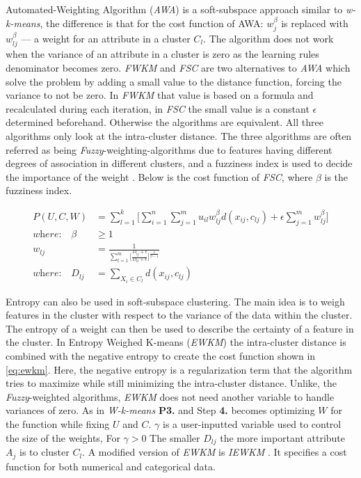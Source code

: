 \documentclass[../report.tex]{subfiles}
\begin{document}
Automated-Weighting Algorithm (\textit{AWA}) \cite{Chan2004} is a soft-subspace approach similar to \textit{w-k-means}, the difference is that for the cost function of AWA: $w_j^\beta$ is replaced with $w_{ lj }^\beta$ --- a weight for an attribute in a cluster $C_l$. The algorithm does not work when the variance of an attribute in a cluster is zero as the learning rules denominator becomes zero\cite{Jing2005}. \textit{ FWKM } \cite{Jing2005} and \textit{FSC} are two alternatives to \textit{AWA} which solve the problem by adding a small value to the distance function, forcing the variance to not be zero. In \textit{FWKM} that value is based on a formula and recalculated during each iteration, in \textit{FSC} the small value is a constant $\epsilon$ determined beforehand. Otherwise the algorithms are equivalent. All three algorithms only look at the intra-cluster distance. The three algorithms are often referred as being \textit{Fuzzy}-weighting-algorithms due to features having different degrees of association in different clusters, and a fuzziness index is used to decide the importance of the weight \cite{Gan2006}. Below is the cost function of \textit{FSC}, where $\beta$ is the fuzziness index.

\begin{align}
\label{eq:cost-fsc}
  P(U,C,W) &= \sum^k_{l=1} \Bigg[ \sum^n_{i=1} \sum^m_{j=1} u_{il} w_{ lj }^{\beta} d(x_{ij},c_{lj}) + \epsilon \sum_{j=1}^{m}{ w_{lj}^{\beta} } \Bigg] \\
\textit{where:}\quad\beta&\geq 1 \\
\label{eq:fsc}
w_{lj} &= \frac{1}{{\sum_{t=1}^{m}\Big[\frac{D_{lj} + \epsilon}{D_{lt} + \epsilon}}\Big]^{\frac{1}{\beta - 1}}} \\
\textit{where:}\quad D_{ lj } &= \sum_{X_i \in C_l}{d(x_{ij},c_{ lj })}
\end{align}


Entropy can also be used in soft-subspace clustering. The main idea is to weigh features in the cluster with respect to the variance of the data within the cluster\cite{Domeniconi2007}. The entropy of a weight can then be used to describe the certainty of a feature in the cluster. In Entropy Weighed K-means (\textit{EWKM}) \cite{Jing2007} the intra-cluster distance is combined with the negative entropy to create the cost function shown in \ref{eq:ewkm}. Here, the negative entropy is a regularization term that the algorithm tries to maximize while still minimizing the intra-cluster distance. Unlike, the \textit{Fuzzy}-weighted algorithms, \textit{EWKM} does not need another variable to handle variances of zero. As in \textit{W-k-means} \textbf{P3.} and Step \textbf{4.} becomes optimizing $W$ for the function while fixing $U$ and $C$. $\gamma$ is a user-inputted variable used to control the size of the weights, For $\gamma > 0$ The smaller $D_{ lj }$ the more important attribute $A_j$ is to cluster $C_l$. A modified version of \textit{EWKM} is \textit{IEWKM} \cite{Li2008}. It specifies a cost function for both numerical and categorical data.
\end{document}
